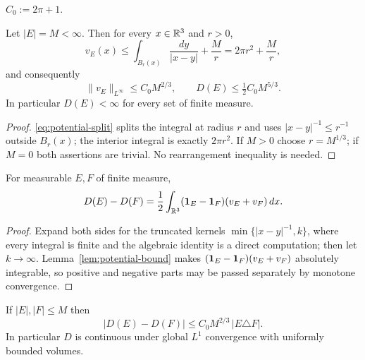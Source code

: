 \begin{notation}\label{not:C0}
$C_0:=2\pi+1$.
\end{notation}

\begin{lemma}\label{lem:potential-bound}
Let $|E|=M<\infty$.  Then for every $x\in\mathbb R^3$ and $r>0$,
\begin{equation}\label{eq:potential-split}
  v_E(x)\le\int_{B_r(x)}\frac{dy}{|x-y|}+\frac Mr=2\pi r^2+\frac Mr ,
\end{equation}
and consequently
\begin{equation}\label{eq:potential-bound}
  \|v_E\|_{L^\infty}\le C_0M^{2/3},
  \qquad
  D(E)\le\tfrac12C_0M^{5/3}.
\end{equation}
In particular $D(E)<\infty$ for every set of finite measure.
\end{lemma}

\begin{proof}
\eqref{eq:potential-split} splits the integral at radius $r$ and uses
$|x-y|^{-1}\le r^{-1}$ outside $B_r(x)$; the interior integral is exactly
$2\pi r^2$.  If $M>0$ choose $r=M^{1/3}$; if $M=0$ both assertions are
trivial.  No rearrangement inequality is needed.
\end{proof}

\begin{lemma}\label{lem:coulomb-bilinear}
For measurable $E,F$ of finite measure,
\begin{equation}\label{eq:coulomb-bilinear}
  D(E)-D(F)=\frac12\int_{\mathbb R^3}(\mathbf 1_{E}-\mathbf 1_{F})(v_E+v_F)\,dx .
\end{equation}
\end{lemma}

\begin{proof}
Expand both sides for the truncated kernels $\min\{|x-y|^{-1},k\}$, where
every integral is finite and the algebraic identity is a direct computation;
then let $k\to\infty$.  Lemma~\ref{lem:potential-bound} makes
$(\mathbf 1_{E}-\mathbf 1_{F})(v_E+v_F)$ absolutely integrable, so positive and negative
parts may be passed separately by monotone convergence.
\end{proof}

\begin{lemma}\label{lem:coulomb-lipschitz}
If $|E|,|F|\le M$ then
\begin{equation}\label{eq:coulomb-lipschitz}
  |D(E)-D(F)|\le C_0M^{2/3}\,|E\triangle F| .
\end{equation}
In particular $D$ is continuous under global $L^1$ convergence with uniformly
bounded volumes.
\end{lemma}

